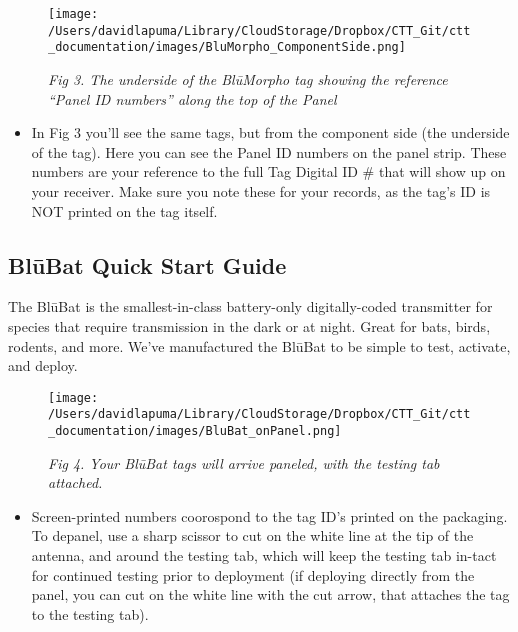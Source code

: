 \documentclass[
]{article}
\providecommand{\tightlist}{%
  \setlength{\itemsep}{0pt}\setlength{\parskip}{0pt}}
\begin{document}
\begin{figure}
\hypertarget{id}{%
\centering
\texttt{[image: /Users/davidlapuma/Library/CloudStorage/Dropbox/CTT\_Git/ctt\_documentation/images/BluMorpho\_ComponentSide.png]}
\caption{\emph{Fig 3. The underside of the BlūMorpho tag showing the
reference ``Panel ID numbers'' along the top of the Panel}}\label{id}
}
\end{figure}

\begin{itemize}
\tightlist
\item
  In Fig 3 you'll see the same tags, but from the component side (the
  underside of the tag). Here you can see the Panel ID numbers on the
  panel strip. These numbers are your reference to the full Tag Digital
  ID \# that will show up on your receiver. Make sure you note these for
  your records, as the tag's ID is NOT printed on the tag itself.
\end{itemize}

\hypertarget{blux16bbat-quick-start-guide}{%
\subsection{BlūBat Quick Start
Guide}\label{blux16bbat-quick-start-guide}}

The BlūBat is the smallest-in-class battery-only digitally-coded
transmitter for species that require transmission in the dark or at
night. Great for bats, birds, rodents, and more. We've manufactured the
BlūBat to be simple to test, activate, and deploy.

\begin{figure}
\hypertarget{id}{%
\centering
\texttt{[image: /Users/davidlapuma/Library/CloudStorage/Dropbox/CTT\_Git/ctt\_documentation/images/BluBat\_onPanel.png]}
\caption{\emph{Fig 4. Your BlūBat tags will arrive paneled, with the
testing tab attached.}}\label{id}
}
\end{figure}

\begin{itemize}
\tightlist
\item
  Screen-printed numbers coorospond to the tag ID's printed on the
  packaging. To depanel, use a sharp scissor to cut on the white line at
  the tip of the antenna, and around the testing tab, which will keep
  the testing tab in-tact for continued testing prior to deployment (if
  deploying directly from the panel, you can cut on the white line with
  the cut arrow, that attaches the tag to the testing tab).
\end{itemize}
\end{document}
